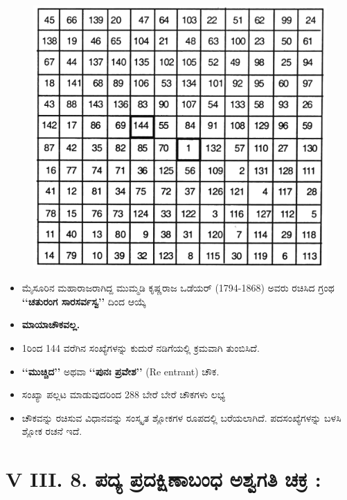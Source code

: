 \begin{figure}[H]
\includegraphics[scale=1.1]{src/figures/chap6/fig6-10.jpg}
\end{figure}
\begin{itemize}
	\item ಮೈಸೂರಿನ ಮಹಾರಾಜರಾಗಿದ್ದ ಮುಮ್ಮಡಿ ಕೃಷ್ಣರಾಜ ಒಡೆಯರ್ (1794-1868) ಅವರು ರಚಿಸಿದ ಗ್ರಂಥ \textbf{‘‘ಚತುರಂಗ ಸಾರಸರ್ವಸ್ವ’’} ದಿಂದ ಆಯ್ಕೆ \smallskip
	\item \textbf{ಮಾಯಾಚೌಕವಲ್ಲ.}\smallskip
	\item 1ರಿಂದ 144 ವರೆಗಿನ ಸಂಖ್ಯೆಗಳನ್ನು ಕುದುರೆ ನಡಿಗೆಯಲ್ಲಿ ಕ್ರಮವಾಗಿ ತುಂಬಿಸಿದೆ.\smallskip
	\item \textbf{‘‘ಮುಚ್ಚಿದ’’} ಅಥವಾ \textbf{‘‘ಪುನಃ ಪ್ರವೇಶ’’} (Re entrant) ಚೌಕ.\smallskip
	\item ಸಂಖ್ಯಾ ಪಲ್ಲಟ ಮಾಡುವುದರಿಂದ 288 ಬೇರೆ ಬೇರೆ ಚೌಕಗಳು ಲಭ್ಯ\smallskip
	\item ಚೌಕವನ್ನು ರಚಿಸುವ ವಿಧಾನವನ್ನು ಸಂಸ್ಕೃತ ಶ್ಲೋಕಗಳ ರೂಪದಲ್ಲಿ ಬರೆಯಲಾಗಿದೆ. ಪದಸಂಖ್ಯೆಗಳನ್ನು ಬಳಸಿ ಶ್ಲೋಕ ರಚನೆ ಇದೆ.
\end{itemize}

\section*{V III. 8. ಪದ್ಯ ಪ್ರದಕ್ಷಿಣಾಬಂಧ ಅಶ್ವಗತಿ ಚಕ್ರ :}

